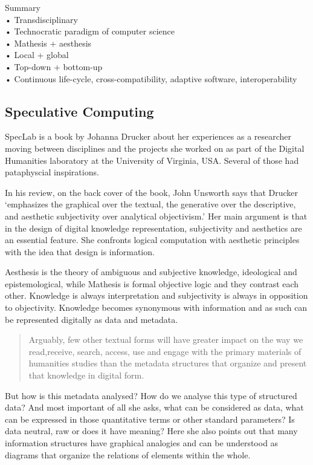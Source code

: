 \begin{shaded}
  Summary\\
  •	Transdisciplinary\\
  •	Technocratic paradigm of computer science\\
  •	Mathesis + aesthesis\\
  •	Local + global\\
  •	Top-down + bottom-up\\
  •	Continuous life-cycle, cross-compatibility, adaptive software, interoperability
\end{shaded}


\subsection*{Speculative Computing}

SpecLab \autocite{Drucker2009} is a book by Johanna Drucker about her experiences as a researcher moving between disciplines and the projects she worked on as part of the Digital Humanities laboratory at the University of Virginia, USA\@. Several of those had pataphyscial inspirations.

In his review, on the back cover of the book, John Unsworth says that Drucker `emphasizes the graphical over the textual, the generative over the descriptive, and aesthetic subjectivity over analytical objectivism.' Her main argument is that in the design of digital knowledge representation, subjectivity and aesthetics are an essential feature. She confronts logical computation with aesthetic principles with the idea that design is information.

Aesthesis is the theory of ambiguous and subjective knowledge, ideological and epistemological, while Mathesis is formal objective logic and they contrast each other. Knowledge is always interpretation and subjectivity is always in opposition to objectivity. Knowledge becomes synonymous with information and as such can be represented digitally as data and metadata.

\begin{quotation}
  Arguably, few other textual forms will have greater impact on the way we read,receive, search, access, use and engage with the primary materials of humanities studies than the metadata structures that organize and present that knowledge in digital form. 
\end{quotation}

But how is this metadata analysed? How do we analyse this type of structured data? And most important of all she asks, what can be considered as data, what can be expressed in those quantitative terms or other standard parameters? Is data neutral, raw or does it have meaning? Here she also points out that many information structures have graphical analogies and can be understood as diagrams that organize the relations of elements within the whole.

